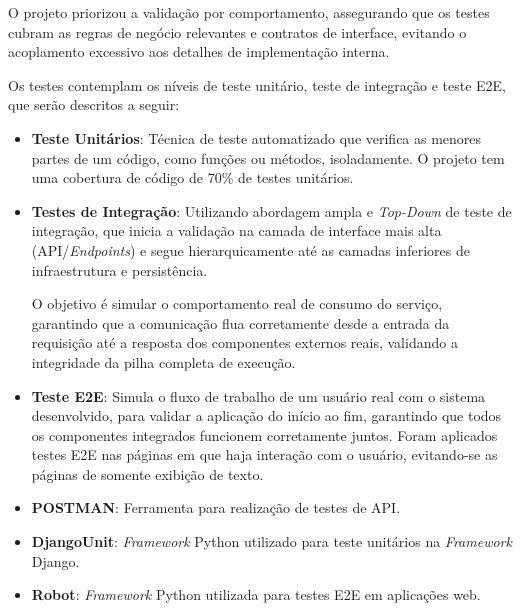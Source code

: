 O projeto priorizou a validação por comportamento, assegurando que os testes cubram as regras de negócio relevantes e contratos de interface, evitando o acoplamento excessivo aos detalhes de implementação interna.

Os testes contemplam os níveis de teste unitário, teste de integração e teste E2E, que serão descritos a seguir:

\begin{itemize}

\item \textbf{Teste Unitários}: Técnica de teste automatizado que verifica as menores partes de um código, como funções ou métodos, isoladamente. O projeto tem uma cobertura de código de 70\% de testes unitários.

\item \textbf{Testes de Integração}: Utilizando abordagem ampla e \textit{Top-Down} de teste de integração, que inicia a validação na camada de interface mais alta (API/\textit{Endpoints}) e segue hierarquicamente até as camadas inferiores de infraestrutura e persistência.

O objetivo é simular o comportamento real de consumo do serviço, garantindo que a comunicação flua corretamente desde a entrada da requisição até a resposta dos componentes externos reais, validando a integridade da pilha completa de execução.


\item \textbf{Teste E2E}: Simula o fluxo de trabalho de um usuário real com o sistema desenvolvido, para validar a aplicação do início ao fim, garantindo que todos os componentes integrados funcionem corretamente juntos. Foram aplicados testes E2E nas páginas em que haja interação com o usuário, evitando-se as páginas de somente exibição de texto.

\end{itemize}

\begin{itemize}
    \item \textbf{POSTMAN}: Ferramenta para realização de testes de API.
    \item \textbf{DjangoUnit}: \textit{Framework} Python utilizado para teste unitários na \textit{Framework} Django.
    \item \textbf{Robot}: \textit{Framework} Python utilizada para testes E2E em aplicações web.
\end{itemize}


